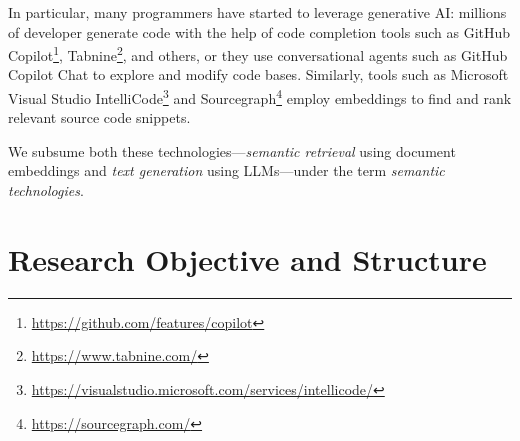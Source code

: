In particular, many programmers have started to leverage generative AI: millions of developer generate code with the help of code completion tools such as GitHub Copilot\footnote{\url{https://github.com/features/copilot}}, Tabnine\footnote{\url{https://www.tabnine.com/}}, and others, or they use conversational agents such as GitHub Copilot Chat%
 to explore and modify code bases.
Similarly, tools such as Microsoft Visual Studio IntelliCode\footnote{\url{https://visualstudio.microsoft.com/services/intellicode/}} and Sourcegraph\footnote{\url{https://sourcegraph.com/}} employ embeddings to find and rank relevant source code snippets.

We subsume both these technologies---\emph{semantic retrieval} using document embeddings and \emph{text generation} using LLMs---under the term \emph{semantic technologies}.

\section*{Research Objective and Structure}

